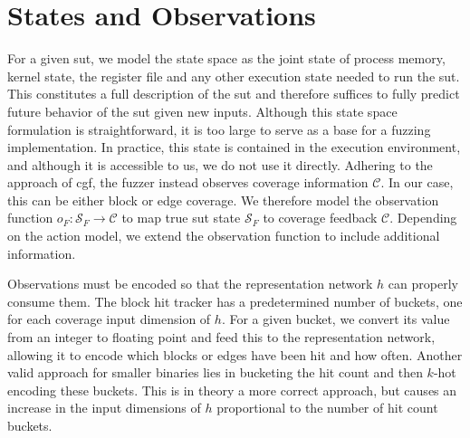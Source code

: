 
\section{States and Observations}\label{sec:mdp-states}

For a given \gls{sut}, we model the state space as the joint state of process memory,
kernel state, the register file and any other execution state needed to run the \gls{sut}.
This constitutes a full description of the \gls{sut} and therefore suffices to fully predict future
behavior of the \gls{sut} given new inputs.
Although this state space formulation is straightforward, it is too large to serve as a
base for a fuzzing implementation.
In practice, this state is contained in the execution environment, and although it
is accessible to us, we do not use it directly.
Adhering to the approach of \gls{cgf}, the fuzzer instead observes coverage information $\mathcal{C}$.
In our case, this can be either block or edge coverage.
We therefore model the observation function $o_F:\mathcal{S}_F\rightarrow\mathcal{C}$ to map
true \gls{sut} state $\mathcal{S}_F$ to coverage feedback $\mathcal{C}$.
Depending on the action model, we extend the observation function to
include additional information.

Observations must be encoded so that the representation network $h$ can properly
consume them.
The block hit tracker has a predetermined number of buckets, one for
each coverage input dimension of $h$.
For a given bucket, we convert its value from an integer to floating point and
feed this to the representation network, allowing it to encode which
blocks or edges have been hit and how often.
Another valid approach for smaller binaries lies in bucketing the hit count and then
$k$-hot encoding these buckets.
This is in theory a more correct approach, but causes an increase in the input dimensions of $h$
proportional to the number of hit count buckets.
